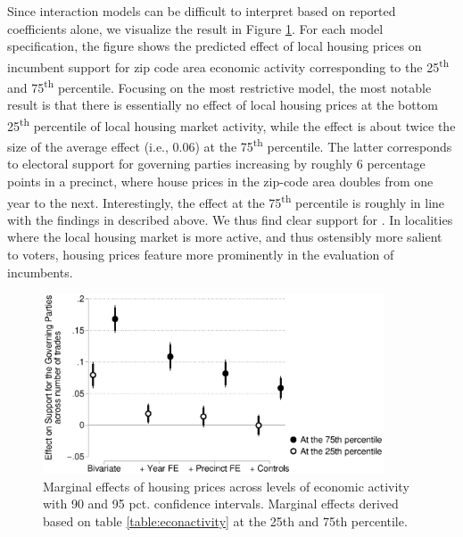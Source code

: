 \documentclass[12pt,a4paper]{article}
\begin{document}
	Since interaction models can be difficult to interpret based on reported coefficients alone, we visualize the result in Figure \ref{localactivity}. For each model specification, the figure shows the predicted effect of local housing prices on incumbent support for zip code area economic activity corresponding to the 25\textsuperscript{th} and 75\textsuperscript{th} percentile. Focusing on the most restrictive model, the most notable result is that there is essentially no effect of local housing prices at the bottom 25\textsuperscript{th} percentile of local housing market activity, while the effect is about twice the size of the average effect  (i.e., 0.06) at the 75\textsuperscript{th} percentile. The latter corresponds to electoral support for governing parties increasing by roughly 6 percentage points in a precinct, where house prices in the zip-code area doubles from one year to the next. Interestingly, the effect at the 75\textsuperscript{th} percentile is roughly in line with the findings in \cite{healy2017presidential} described above. We thus find clear support for \htwo. In localities where the local housing market is more active, and thus ostensibly more salient to voters, housing prices feature more prominently in the evaluation of incumbents. 
	
	
	
	\begin{figure}[htbp!]
		\includegraphics[width=0.9\textwidth]{../figures/localactivity.eps}
		\centering
		\caption{Marginal effects of housing prices across levels of economic activity with 90 and 95 pct. confidence intervals.  Marginal effects derived based on table \ref{table:econactivity} at the 25th and 75th percentile.}\label{localactivity}
	\end{figure}
	
\end{document}

